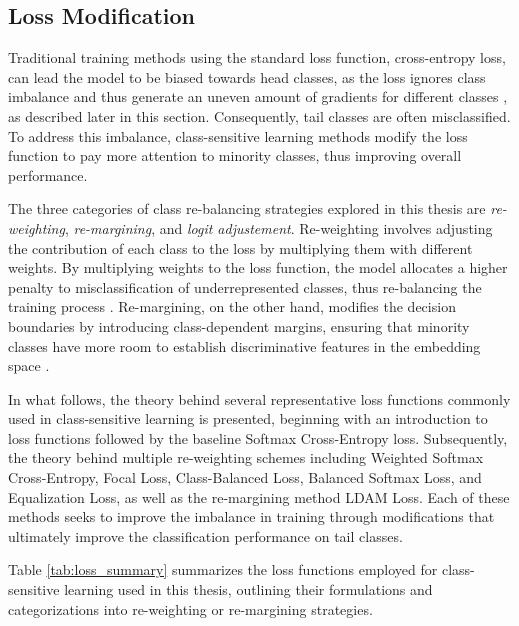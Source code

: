 
\subsection{Loss Modification}
\label{sec:loss_mod}

Traditional training methods using the standard loss function, cross-entropy loss, can lead the model to be biased towards head classes, as the loss ignores class imbalance and thus generate an uneven amount of gradients for different classes \cite{zhang2023deep}, as described later in this section. Consequently, tail classes are often misclassified. To address this imbalance, class-sensitive learning methods modify the loss function  to pay more attention to minority classes, thus improving overall performance.

The three categories of class re-balancing strategies explored in this thesis are \emph{re-weighting}, \emph{re-margining}, and \emph{logit adjustement}. Re-weighting involves adjusting the contribution of each class to the loss by multiplying them with different weights. By multiplying weights to the loss function, the model allocates a higher penalty to misclassification of underrepresented classes, thus re-balancing the training process \cite{zhang2023deep}. Re-margining, on the other hand, modifies the decision boundaries by introducing class-dependent margins, ensuring that minority classes have more room to establish discriminative features in the embedding space \cite{zhang2023deep, cao2019learningimbalanceddatasetslabeldistributionaware}. 

In what follows, the theory behind several representative loss functions commonly used in class-sensitive learning is presented, beginning with an introduction to loss functions followed by the baseline Softmax Cross-Entropy loss. Subsequently, the theory behind multiple re-weighting schemes including Weighted Softmax Cross-Entropy, Focal Loss, Class-Balanced Loss, Balanced Softmax Loss, and Equalization Loss, as well as the re-margining method LDAM Loss. Each of these methods seeks to improve the imbalance in training through modifications that ultimately improve the classification performance on tail classes.

Table \ref{tab:loss_summary} summarizes the loss functions employed for class-sensitive learning used in this thesis, outlining their formulations and categorizations into re-weighting or re-margining strategies.


